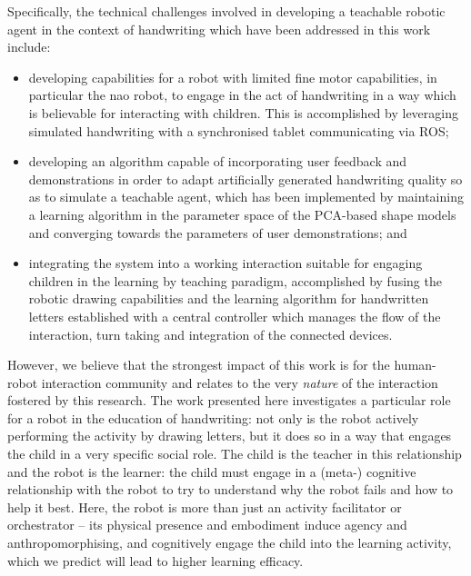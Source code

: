 \documentclass{sig-alternate}
\begin{document}
Specifically, the technical challenges involved in developing a teachable
robotic agent in the context of handwriting which have been addressed in this
work include:

\begin{itemize}

    \item developing capabilities for a robot with limited fine motor
        capabilities, in particular the {\sc nao} robot, to engage in the act of
        handwriting in a way which is believable for interacting with children.
        This is accomplished by leveraging simulated handwriting with a
        synchronised tablet communicating via ROS;

    \item developing an algorithm capable of incorporating user feedback and
        demonstrations in order to adapt artificially generated handwriting
        quality so as to simulate a teachable agent, which has been implemented
        by maintaining a learning algorithm in the parameter space of the
        PCA-based shape models and converging towards the parameters of user
        demonstrations; and

    \item integrating the system into a working interaction suitable for
        engaging children in the learning by teaching paradigm, accomplished by
        fusing the robotic drawing capabilities and the learning algorithm for
        handwritten letters established with a central controller which manages
        the flow of the interaction, turn taking and integration of the
        connected devices.

\end{itemize}


However, we believe that the strongest impact of this work is for the
human-robot interaction community and relates to the very \emph{nature} of the
interaction fostered by this research. The work presented here investigates a
particular role for a robot in the education of handwriting: not only is the
robot actively performing the activity by drawing letters, but it does so in a
way that engages the child in a very specific social role. The child is the
teacher in this relationship and the robot is the learner: the child must engage
in a (meta-) cognitive relationship with the robot to try to understand why the
robot fails and how to help it best.  Here, the robot is more than just an
activity facilitator or orchestrator -- its physical presence and embodiment
induce agency and anthropomorphising, and cognitively engage the child into the
learning activity, which we predict will lead to higher learning efficacy.
\end{document}

